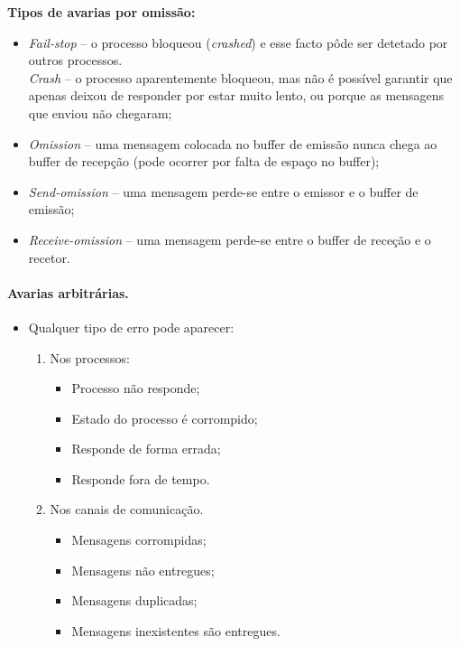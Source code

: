 \documentclass{article}
\begin{document}
\textbf{Tipos de avarias por omissão:}

\begin{itemize}
	\item \textit{Fail-stop} -- o processo bloqueou (\textit{crashed}) e esse facto pôde ser detetado por outros processos.
	\\
	\textit{Crash} -- o processo aparentemente bloqueou, mas não é possível garantir que apenas deixou de responder por estar muito lento, ou porque as mensagens que enviou não chegaram;
	\item \textit{Omission} -- uma mensagem colocada no buffer de emissão nunca chega ao buffer de recepção (pode ocorrer por falta de espaço no buffer);
	\item \textit{Send-omission} -- uma mensagem perde-se entre o emissor e o buffer de emissão;
	\item \textit{Receive-omission} -- uma mensagem perde-se entre o buffer de receção e o recetor.
\end{itemize}


\paragraph{Avarias arbitrárias.}

\begin{itemize}
	\item Qualquer tipo de erro pode aparecer:
	\begin{enumerate}
		\item Nos processos:
			\begin{itemize}
				\item Processo não responde;
				\item Estado do processo é corrompido;
				\item Responde de forma errada;
				\item Responde fora de tempo.
			\end{itemize}
		\item Nos canais de comunicação.
			\begin{itemize}
				\item Mensagens corrompidas; 
				\item Mensagens não entregues;
				\item Mensagens duplicadas;
				\item Mensagens inexistentes são entregues.
			\end{itemize}
	\end{enumerate}
\end{itemize}
\end{document}
